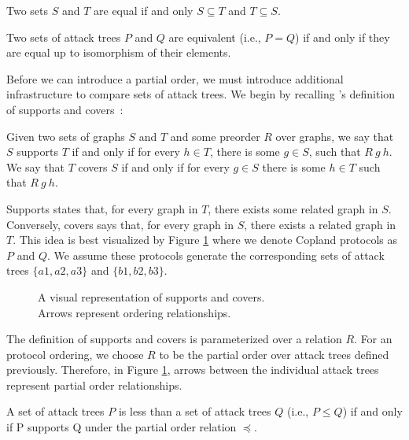 \documentclass[runningheads]{llncs}
\theoremstyle{definition}
\begin{document}
\begin{definition}
  Two sets $S$ and $T$ are equal if and only $S \subseteq T$ and $T
  \subseteq S$. 
\end{definition}

\begin{definition}[Equivalence =]
  Two sets of attack trees $P$ and $Q$ are equivalent (i.e., $P =
  Q$) if and only if they are equal up to isomorphism of their
  elements.
\end{definition}

Before we can introduce a partial order, we must introduce additional
infrastructure to compare sets of attack trees. We begin by recalling
\citeauthor{Rowe:2021:OnOrdering}'s definition of supports and
covers~\citep{Rowe:2021:OnOrdering}: 

\begin{definition}
    Given two sets of graphs $S$ and $T$ and some preorder $R$ over
    graphs, we say that $S$ supports $T$ if and only if for every $h
    \in T$, there is some $g \in S$, such that $R\: g\: h$. We  say
    that $T$ covers $S$ if and only if for every $g \in S$ there is
    some $h \in T$ such that $R\: g\: h$. 
\end{definition}

Supports states that, for every graph in $T$, there exists some
related graph in $S$. Conversely, covers says that, for every graph in
$S$, there exists a related graph in $T$.  This idea is best
visualized by Figure \ref{fig:sup-cov} where we denote Copland
protocols as $P$ and $Q$. We assume these protocols generate the
corresponding sets of attack trees $\{a1, a2, a3 \}$ and
$ \{b1, b2 ,b3\}$.

\begin{figure}[htbp]
    \centering
    
    \captionsetup{justification=centering,margin=1cm}
    \caption[Supports and covers]{A visual representation of supports and covers. \\ Arrows represent ordering relationships.}
    \label{fig:sup-cov}
\end{figure}

The definition of supports and covers is parameterized over a relation
$R$. For an protocol ordering, we choose $R$ to be the partial order
over attack trees defined previously. Therefore, in Figure
\ref{fig:sup-cov}, arrows between the individual attack trees
represent partial order relationships. 

\begin{definition}
  A set of attack trees $P$ is less than a set of attack trees $Q$
  (i.e., $P \leq Q$) if and only if P supports Q under the partial
  order relation $\preceq$. 
\end{definition} 
\end{document}
